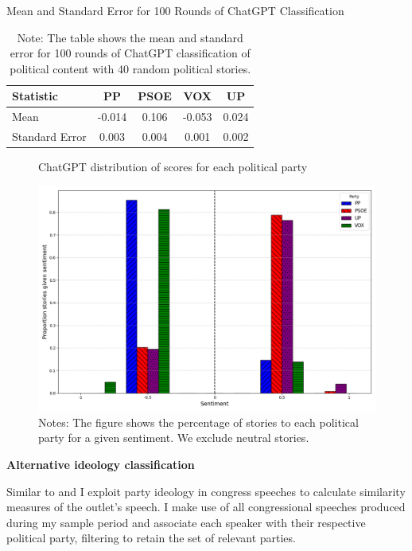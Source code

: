 \documentclass[12pt]{article}
\begin{document}
	
	\begin{table}[H]
		\centering
		\caption{Mean and Standard Error for 100 Rounds of ChatGPT Classification}
		\begin{tabular}{|l|c|c|c|c|}
			\hline
			\textbf{Statistic} & \textbf{PP} & \textbf{PSOE} & \textbf{VOX} & \textbf{UP} \\
			\hline
			Mean & -0.014 & 0.106 & -0.053 & 0.024 \\
			Standard Error & 0.003 & 0.004 & 0.001 & 0.002 \\
			\hline
		\end{tabular}
		\caption*{Note: The table shows the mean and standard error for 100 rounds of ChatGPT classification of political content with 40 random political stories.}
		\label{tab:table_stability}
	\end{table}
	
	
	\begin{figure}[H]
		\centering
		\caption{ChatGPT distribution of scores for each political party}
		\includegraphics[width=120mm]{figures/sentiment_distribution}
		\caption*{\small Notes: The figure shows the percentage of stories to each political party for a given sentiment. We exclude neutral stories.}
		\label{fig:sent_distribution}
	\end{figure}
	
	\textbf{Alternative ideology classification}
	
	
Similar to \cite{gentzkow2010media} and \cite{laver2003extracting} I exploit party ideology in congress speeches to calculate similarity measures of the outlet's speech. I make use of all congressional speeches produced during my sample period and associate each speaker with their respective political party, filtering to retain the set of relevant parties.
\end{document}
